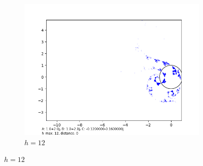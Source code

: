 \documentclass[12pt,a4paper,reqno,parskip=full]{amsart}
\numberwithin{equation}{section}
\theoremstyle{plain}
\theoremstyle{definition}
\begin{document}
\begin{figure}[H]
     \hfill
     \begin{subfigure}[b]{0.3\textwidth}
         \centering
         \includegraphics[width=\textwidth]{images/a2b2/a2,b2,h12,d0.png}
         \caption{$h=12$}
         \label{fig:a2b2h12}
     \end{subfigure}
     

\end{figure}
\end{document}
